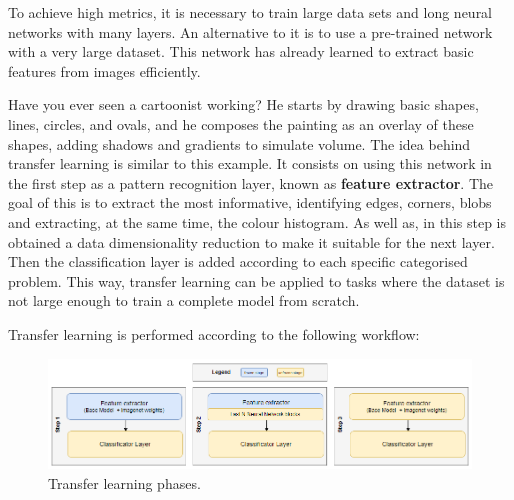 To achieve high metrics, it is necessary to train large data sets and long neural networks with many layers. An alternative to it is to use a pre-trained network with a very large dataset. This network has already learned to extract basic features from images efficiently. 

Have you ever seen a cartoonist working? He starts by drawing basic shapes, lines, circles, and ovals, and he composes the painting as an overlay of these shapes, adding shadows and gradients to simulate volume. The idea behind transfer learning is similar to this example. It consists on using this network in the first step as a pattern recognition layer, known as \textbf{feature extractor}. The goal of this is to extract the most informative, identifying edges, corners, blobs and extracting, at the same time, the colour histogram.  As well as, in this step is obtained a data dimensionality reduction to make it suitable for the next layer. Then the classification layer is added according to each specific categorised problem. This way, transfer learning can be applied to tasks where the dataset is not large enough to train a complete model from scratch.

Transfer learning is performed according to the following workflow:

\begin{figure}[ht]
    \begin{center}
        \includegraphics[scale=1.0]{images/Building/Transfer Learning phases.png}
        \caption{Transfer learning phases.}
    \label{fig: Transfer learning phases}    
    \end{center}
\end{figure}

